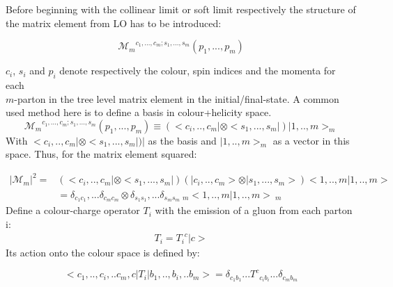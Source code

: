Before beginning with the collinear limit or soft limit respectively the structure of the matrix element from LO has to be introduced:

\begin{equation}
{\mathcal{M}_m}^{c_1,...,c_m;s_1,...,s_m}(p_1,..., p_m)
\end{equation}

$ c_i $, $ s_i $ and $ p_i $ denote respectively the colour, spin indices and the momenta for each\\ $m$-parton in the tree level matrix element in the initial/final-state. A common used method here is to define a basis in colour+helicity space.
\begin{equation}
{\mathcal{M}_m}^{c_1,...,c_m;s_1,...,s_m}(p_1,..., p_m)\equiv(<c_i,..,c_m|\otimes <s_1,...,s_m|)|1,..,m>_m
\end{equation}
With $ <c_i,..,c_m|\otimes <s_1,...,s_m|)| $ as the basis and $ |1,..,m>_m $ as a vector in this space.
Thus, for the matrix element squared:

\begin{equation}
\begin{split}
\vert \mathcal{M}_m \vert^2=& (< c_i,..,c_m | \otimes < s_1,...,s_m|)(| c_i,..,c_m > \otimes | s_1,...,s_m >) < 1,..,m | 1,..,m > \\
&=\delta_{c_1 c_1},...\delta_{c_m c_m} \otimes \delta_{s_1 s_1},...\delta_{s_ms_m} \:_m < 1,..,m | 1,..,m > \:_m
\end{split}
\end{equation}
Define a colour-charge operator  $ {T_i} $ with the
emission of a gluon from each parton i:
\begin{equation}
\begin{split}
T_i = {T_i}^c |c>
\end{split}
\end{equation}
Its action onto the colour space is defined by:

\begin{equation}
<c_1,..,c_i,..c_m,c|T_i|b_1,..,b_i,..b_m>=\delta_{c_1b_1}...{T^c}_{c_ib_i}
...\delta_{c_mb_m}
\end{equation}

